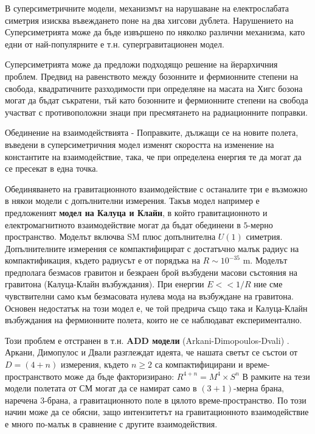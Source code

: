 В суперсиметричните модели, механизмът на нарушаване на електрослабата симетрия изисква въвеждането поне на два хигсови дублета. Нарушението на Суперсиметрията може да бъде извършено по няколко различни механизма, като едни от най-популярните е т.н. супергравитационен модел.
\par Суперсиметрията може да предложи подходящо решение на йерархичния проблем. Предвид на равенството между бозонните и фермионните степени на свобода, квадратичните разходимости при определяне на масата на Хигс бозона могат да бъдат съкратени, тъй като бозонните и фермионните степени на свобода участват с противоположни знаци при пресмятането на радиационните поправки.
\par Обединение на взаимодействията - Поправките, дължащи се на новите полета, въведени в суперсиметричния модел изменят скоростта на изменение на константите на взаимодействие, така, че при определена енергия те да могат да се пресекат в една точка.
\par Обединяването на гравитационното взаимодействие с останалите три е възможно в някои модели с допълнителни измерения. Такъв модел например е предложеният {\bf модел на Калуца и Клайн}, в който гравитационното и електромагнитното взаимодействие могат да бъдат обединени в $5$-мерно пространство. Моделът включва SM плюс допълнителна $U(1)$ симетрия. Допълнителните измерения се компактифицират с достатъчно малък радиус на компактификация, където радиусът е от порядъка на $R \sim 10^{-35}$ m. Моделът предполага безмасов гравитон и безкраен брой възбудени масови състояния на гравитона (Калуца-Клайн възбуждания). При енергии $E<<1/R$ ние сме чувствителни само към безмасовата нулева мода на възбуждане на гравитона. Основен недостатък на този модел е, че той предрича също така и Калуца-Клайн възбуждания на фермионните полета, които не се наблюдават експериментално.
\par Този проблем е отстранен в т.н. {\bf ADD модели} (Arkani-Dimopoulos-Dvali) \cite{ADD}. Аркани, Димопулос и Двали разглеждат идеята, че нашата светът се състои от $D = (4+n)$ измерения, където $n\geqslant 2$ са компактифицирани и време-пространството може да бъде факторизирано:
$R^{4+n}=M^4\times S^n$
В рамките на тези модели полетата от СМ могат да се намират само в $(3+1)$-мерна брана, наречена $3$-брана, а гравитационното поле в цялото време-пространство. По този начин може да се обясни, защо интензитетът на гравитационното взаимодействие е много по-малък в сравнение с другите взаимодействия. 



